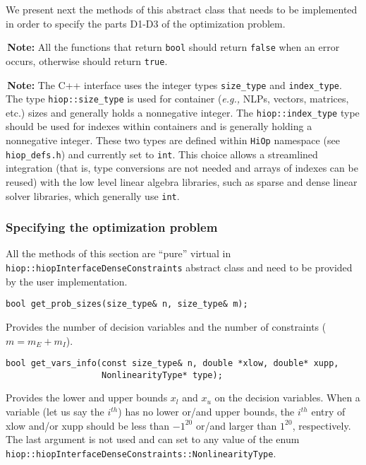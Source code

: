 \documentclass[11pt]{article}
\newcounter{line}
\newcommand{\warningSymbol}{\raisebox{0.9\depth}{\danger}}
\newcommand{\warningcp}[1]{%
        \smallskip \noindent \textcolor{warningColorText}{\warningSymbol{}}\,\textbf{#1} %
    }
\newcommand{\Hi}{\texttt{HiOp}\xspace}
\begin{document}
 We present next the methods of this abstract class that needs to be implemented in order to specify the parts D1-D3 of the optimization problem. 

 \warningcp{Note:} All the functions that return \texttt{bool} should return \texttt{false} when an error occurs, otherwise should return \texttt{true}.

 \warningcp{Note:} The C++ interface uses the integer types \texttt{size\_type} and \texttt{index\_type}.  The type \texttt{hiop::size\_type} is used for container (\textit{e.g.,} NLPs, vectors, matrices, etc.) sizes and generally holds a nonnegative integer. The \texttt{hiop::index\_type} type should be used for indexes within containers and is generally holding a nonnegative integer. These two types are defined within \Hi namespace (see \texttt{hiop\_defs.h}) and currently set to \texttt{int}. This choice allows a streamlined integration (that is, type conversions are not needed and arrays of indexes can be reused) with the low level linear algebra libraries, such as sparse and dense linear solver libraries, which generally use \texttt{int}.

\subsubsection{Specifying the optimization problem}

All the methods of this section are ``pure'' virtual in \texttt{hiop::hiopInterfaceDenseConstraints} abstract class  and need to be provided by the user implementation.

\begin{lstlisting} 
bool get_prob_sizes(size_type& n, size_type& m);
\end{lstlisting} 
\noindent Provides the number of decision variables and the number of constraints ($m=m_E+m_I$).


\begin{lstlisting} 
bool get_vars_info(const size_type& n, double *xlow, double* xupp, 
                   NonlinearityType* type);
\end{lstlisting} 

\noindent Provides the lower and upper bounds $x_l$ and $x_u$ on the decision variables. When a variable (let us say the $i^{th}$) has no lower or/and upper bounds, the  $i^{th}$ entry of xlow and/or xupp should be less than $-1^{20}$ or/and larger than $1^{20}$, respectively. The last argument is not used and can set to any value of the enum \texttt{hiop::hiopInterfaceDenseConstraints::NonlinearityType}.
\end{document}
